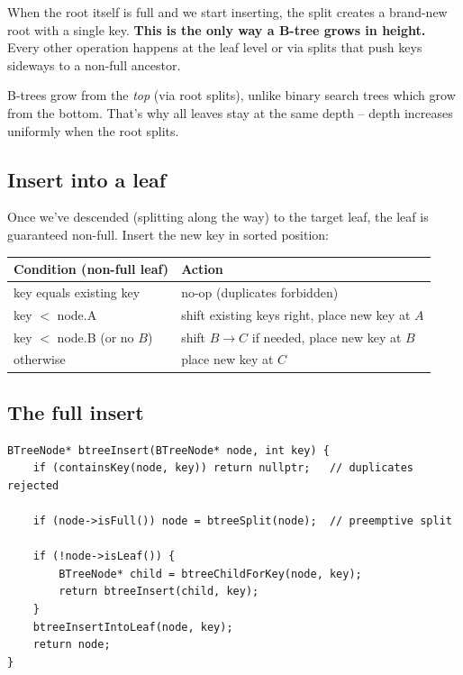 \documentclass[11pt]{article}
\begin{document}
When the root itself is full and we start inserting, the split creates a brand-new root with a single key. \textbf{This is the only way a B-tree grows in height.} Every other operation happens at the leaf level or via splits that push keys sideways to a non-full ancestor.

\begin{ideabox}
B-trees grow from the \emph{top} (via root splits), unlike binary search trees which grow from the bottom. That's why all leaves stay at the same depth -- depth increases uniformly when the root splits.
\end{ideabox}

\subsection*{Insert into a leaf}

Once we've descended (splitting along the way) to the target leaf, the leaf is guaranteed non-full. Insert the new key in sorted position:

\begin{center}
\begin{tabular}{ll}
\hline
Condition (non-full leaf) & Action \\
\hline
key equals existing key & no-op (duplicates forbidden) \\
key $<$ node.A & shift existing keys right, place new key at $A$ \\
key $<$ node.B (or no $B$) & shift $B \to C$ if needed, place new key at $B$ \\
otherwise & place new key at $C$ \\
\hline
\end{tabular}
\end{center}

\subsection*{The full insert}

\begin{lstlisting}[basicstyle=\ttfamily\small,frame=single]
BTreeNode* btreeInsert(BTreeNode* node, int key) {
    if (containsKey(node, key)) return nullptr;   // duplicates rejected

    if (node->isFull()) node = btreeSplit(node);  // preemptive split

    if (!node->isLeaf()) {
        BTreeNode* child = btreeChildForKey(node, key);
        return btreeInsert(child, key);
    }
    btreeInsertIntoLeaf(node, key);
    return node;
}
\end{lstlisting}
\end{document}
